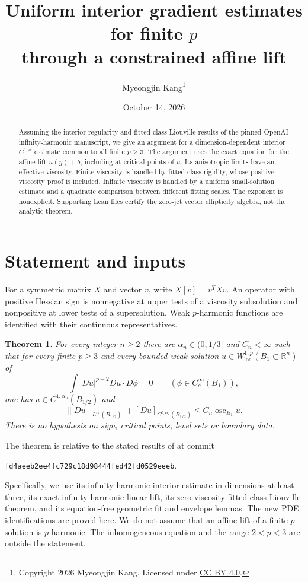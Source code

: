 \documentclass[11pt]{article}
\title{Uniform interior gradient estimates for finite $p$\texorpdfstring{\\}{ }through a constrained affine lift}
\author{Myeongjin Kang\thanks{Copyright 2026 Myeongjin Kang. Licensed under \href{https://creativecommons.org/licenses/by/4.0/}{CC BY 4.0}.}}
\date{October 14, 2026}
\newtheorem{theorem}{Theorem}[section]
\theoremstyle{remark}\newtheorem{remark}[theorem]{Remark}
\newcommand{\osc}{\operatorname{osc}}
\newcommand{\R}{\mathbb R}
\begin{document}
\maketitle

\begin{abstract}
Assuming the interior regularity and fitted-class Liouville results
of the pinned OpenAI infinity-harmonic manuscript, we give an argument
for a dimension-dependent interior $C^{1,\alpha}$ estimate common to
all finite $p\geq3$. The argument uses the exact equation for the
affine lift $u(y)+b$, including at critical points of $u$. Its
anisotropic limits have an effective viscosity. Finite viscosity is
handled by fitted-class rigidity, whose positive-viscosity proof is
included. Infinite viscosity is handled by a uniform small-solution
estimate and a quadratic comparison between different fitting scales.
The exponent is nonexplicit. Supporting Lean files certify the
zero-jet vector ellipticity algebra, not the analytic theorem.
\end{abstract}

\section{Statement and inputs}

For a symmetric matrix $X$ and vector $v$, write $X[v]=v^TXv$.
An operator with positive Hessian sign is nonnegative at upper tests
of a viscosity subsolution and nonpositive at lower tests of a
supersolution. Weak $p$-harmonic functions are identified with their
continuous representatives.

\begin{theorem}\label{thm:main}
For every integer $n\geq2$ there are $\alpha_n\in(0,1/3]$ and
$C_n<\infty$ such that for every finite $p\geq3$ and every bounded
weak solution $u\in W^{1,p}_{\mathrm{loc}}(B_1\subset\R^n)$ of
\[
 \int |Du|^{p-2}Du\cdot D\phi=0\qquad(\phi\in C_c^\infty(B_1)),
\]
one has $u\in C^{1,\alpha_n}(B_{1/2})$ and
\begin{equation}\label{eq:main}
 \|Du\|_{L^\infty(B_{1/2})}+[Du]_{C^{0,\alpha_n}(B_{1/2})}
 \leq C_n\osc_{B_1}u.
\end{equation}
There is no hypothesis on sign, critical points, level sets or boundary data.
\end{theorem}

The theorem is relative to the stated results of \cite{OpenAI} at commit
\begin{center}\texttt{fd4aeeb2ee4fc729c18d98444fed42fd0529eeeb}.\end{center}
Specifically,
we use its infinity-harmonic interior estimate in dimensions at least
three, its exact infinity-harmonic linear lift, its zero-viscosity
fitted-class Liouville theorem, and its equation-free geometric fit
and envelope lemmas. The new PDE identifications are proved here.
We do not assume that an affine lift of a finite-$p$ solution is
$p$-harmonic. The inhomogeneous equation and the range $2<p<3$ are
outside the statement.
\end{document}
